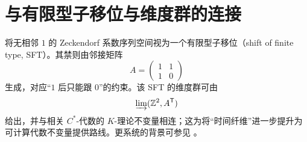 
\section{与有限型子移位与维度群的连接}
\label{app:sft}

将无相邻 $1$ 的 Zeckendorf 系数序列空间视为一个有限型子移位（shift of finite type, SFT）。其禁则由邻接矩阵
\[
A=\begin{pmatrix}
1 & 1\\
1 & 0
\end{pmatrix}
\]
生成，对应“$1$ 后只能跟 $0$”的约束。该 SFT 的维度群可由
\[
\varinjlim(\mathbb{Z}^2, A^{\mathsf{T}})
\]
给出，并与相关 $C^\ast$-代数的 $K$-理论不变量相连；这为将“时间纤维”进一步提升为可计算代数不变量提供路线。更系统的背景可参见 \cite{lind1995symbolic}。

